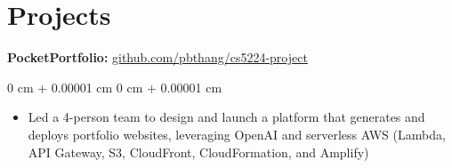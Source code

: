\documentclass[10pt, letterpaper]{article}
\newenvironment{highlights}{
    \begin{itemize}[
        topsep=0.05 cm,
        parsep=0.05 cm,
        partopsep=0pt,
        itemsep=0pt,
        leftmargin=0 cm + 10pt
    ]
}{
    \end{itemize}
} %
\newenvironment{onecolentry}{
    \begin{adjustwidth}{
        0 cm + 0.00001 cm
    }{
        0 cm + 0.00001 cm
    }
}{
    \end{adjustwidth}
} %
\newenvironment{twocolentry}[2][]{
    \onecolentry
    \def\secondColumn{#2}
    \setcolumnwidth{\fill, 4.5 cm}
    \begin{paracol}{2}
}{
    \switchcolumn \raggedleft \secondColumn
    \end{paracol}
    \endonecolentry
} %
\begin{document}



        

            

                


    
    \section{Projects}



        

        \textbf{PocketPortfolio:}
        \href{https://github.com/pbthang/cs5224-project}{github.com/pbthang/cs5224-project}

        \vspace{0.06 cm}
        \begin{onecolentry}
            \begin{highlights}
                \item Led a 4-person team to design and launch a platform that generates and deploys portfolio websites, leveraging OpenAI and serverless AWS (Lambda, API Gateway, S3, CloudFront, CloudFormation, and Amplify)
            \end{highlights}
        \end{onecolentry}


        \vspace{0.12 cm}
\end{document}
